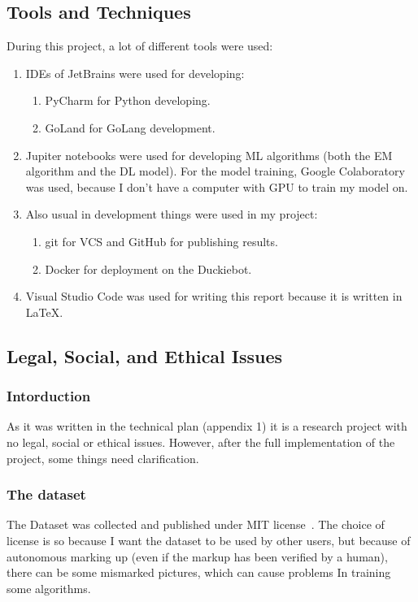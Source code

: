 \subsection{Tools and Techniques}
During this project, a lot of different tools were used:
\begin{enumerate}
    \item IDEs of JetBrains were used for developing:
    \begin{enumerate}
        \item PyCharm for Python developing.
        \item GoLand for GoLang development.
    \end{enumerate}
    \item Jupiter notebooks were used for developing ML algorithms (both the EM algorithm and the DL model). For the model training, Google Colaboratory was used, 
    because I don't have a computer with GPU to train my model on.
    \item Also usual in development things were used in my project:
    \begin{enumerate}
        \item git for VCS and GitHub for publishing results.
        \item Docker for deployment on the Duckiebot.
    \end{enumerate}
    \item Visual Studio Code was used for writing this report because it is written in \LaTeX. 
\end{enumerate}

\subsection{Legal, Social, and Ethical Issues}
\subsubsection{Intorduction}
As it was written in the technical plan (appendix 1) it is a research project with no legal, social or ethical issues. However, after the full implementation of
the project, some things need clarification.
\subsubsection{The dataset}
The Dataset was collected and published under MIT license~\cite{mit}. The choice of license is so because I want the dataset to be used by other users, but
because of autonomous marking up (even if the markup has been verified by a human), there can be some mismarked pictures, which can cause problems In training some 
algorithms. 
